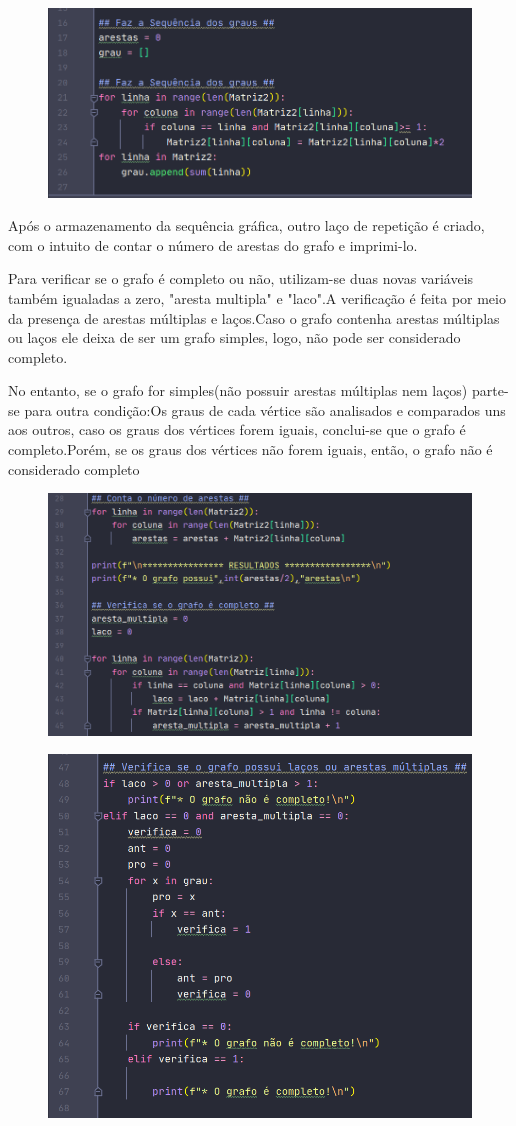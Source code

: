 \documentclass{article}
\begin{document}
	\begin{figure}[H]
		\centering
		\includegraphics[width=0.5\linewidth]{"Figuras/Print2"}
		\label{fig:print2}
		\caption{}
	\end{figure}\vspace*{0.3cm}
	
	Após o armazenamento da sequência gráfica, outro laço de repetição é criado, com o intuito de contar o número de arestas do grafo e imprimi-lo.


	Para verificar se o grafo é completo ou não, utilizam-se duas novas variáveis também igualadas a zero, "aresta \textunderscore multipla" e "laco".A verificação é feita por meio da presença de arestas múltiplas e laços.Caso o grafo contenha arestas múltiplas ou laços ele deixa de ser um grafo simples, logo, não pode ser considerado completo.
	
	
	No entanto, se o grafo for simples(não possuir arestas múltiplas nem laços) parte-se para outra condição:Os graus de cada vértice são analisados e comparados uns aos outros, caso os graus dos vértices forem iguais, conclui-se que o grafo é completo.Porém, se os graus dos vértices não forem iguais, então, o grafo não é considerado completo
	
	\begin{figure}[H]
		\centering
		\includegraphics[width=0.5\linewidth]{"Figuras/Print3"}
		\label{fig:print3}
		\caption{}
	\end{figure}\vspace*{0.3cm}

	\begin{figure}[H]
		\centering
		\includegraphics[width=0.5\linewidth]{"Figuras/Print4"}
		\label{fig:print4}
		\caption{}
	\end{figure}\vspace*{0.3cm}
\end{document}
